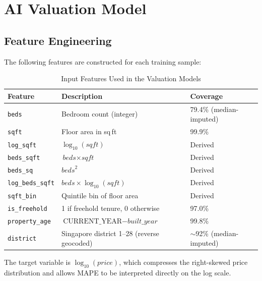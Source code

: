 \section{AI Valuation Model}

\subsection{Feature Engineering}

The following features are constructed for each training sample:

\begin{table}[!ht]
    \centering
    \caption{Input Features Used in the Valuation Models}
    \label{tab:features}
    \renewcommand{\arraystretch}{1.2}
    \begin{tabular}{@{}lll@{}}
    \toprule
    \textbf{Feature} & \textbf{Description} & \textbf{Coverage} \\ \midrule
    \texttt{beds}           & Bedroom count (integer)                  & 79.4\% (median-imputed) \\
    \texttt{sqft}           & Floor area in sq\,ft                     & 99.9\% \\
    \texttt{log\_sqft}      & $\log_{10}(\textit{sqft})$               & Derived \\
    \texttt{beds\_sqft}     & $\textit{beds} \times \textit{sqft}$     & Derived \\
    \texttt{beds\_sq}       & $\textit{beds}^2$                        & Derived \\
    \texttt{log\_beds\_sqft}& $\textit{beds} \times \log_{10}(\textit{sqft})$ & Derived \\
    \texttt{sqft\_bin}      & Quintile bin of floor area               & Derived \\
    \texttt{is\_freehold}   & 1 if freehold tenure, 0 otherwise        & 97.0\% \\
    \texttt{property\_age}  & $\text{CURRENT\_YEAR} - \textit{built\_year}$ & 99.8\% \\
    \texttt{district}       & Singapore district 1--28 (reverse geocoded)  & $\sim$92\% (median-imputed) \\
    \bottomrule
    \end{tabular}
\end{table}

The target variable is $\log_{10}(\textit{price})$, which compresses the right-skewed price
distribution and allows MAPE to be interpreted directly on the log scale.

